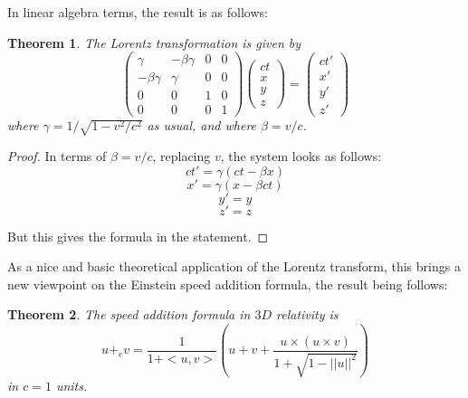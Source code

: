 \documentclass[12pt]{amsbook}
\newtheorem{theorem}{Theorem}[chapter]
\begin{document}
In linear algebra terms, the result is as follows:


\begin{theorem}
The Lorentz transformation is given by
$$\begin{pmatrix}
\gamma&-\beta\gamma&0&0\\
-\beta\gamma&\gamma&0&0\\
0&0&1&0\\
0&0&0&1
\end{pmatrix}
\begin{pmatrix}ct\\ x\\ y\\ z\end{pmatrix}
=\begin{pmatrix}ct'\\ x'\\ y'\\ z'\end{pmatrix}$$
where $\gamma=1/\sqrt{1-v^2/c^2}$ as usual, and where $\beta=v/c$.
\end{theorem}

\begin{proof}
In terms of $\beta=v/c$, replacing $v$, the system looks as follows:
$$ct'=\gamma(ct-\beta x)$$
$$x'=\gamma(x-\beta ct)$$
$$y'=y$$
$$z'=z$$

But this gives the formula in the statement.
\end{proof}

As a nice and basic theoretical application of the Lorentz transform, this brings a new viewpoint on the Einstein speed addition formula, the result being follows:

\begin{theorem}
The speed addition formula in $3D$ relativity is
$$u+_ev=\frac{1}{1+<u,v>}\left(u+v+\frac{u\times(u\times v)}{1+\sqrt{1-||u||^2}}\right)$$
in $c=1$ units.
\end{theorem}
\end{document}
